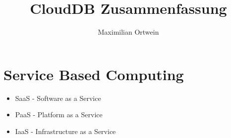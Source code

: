 \documentclass[a4paper]{scrartcl}
\begin{document}
\author{Maximilian Ortwein}
\title{CloudDB Zusammenfassung }
\fancyfoot[C]{\thepage}
\renewcommand{\footrulewidth}{0.5pt}
\renewcommand{\headrulewidth}{0.5pt}
\maketitle
\tableofcontents
\pagebreak

\section{Service Based Computing}
\begin{itemize}
\item SaaS - Software as a Service
\item PaaS - Platform as a Service
\item IaaS - Infrastructure as a Service
\end{itemize}
\end{document}
